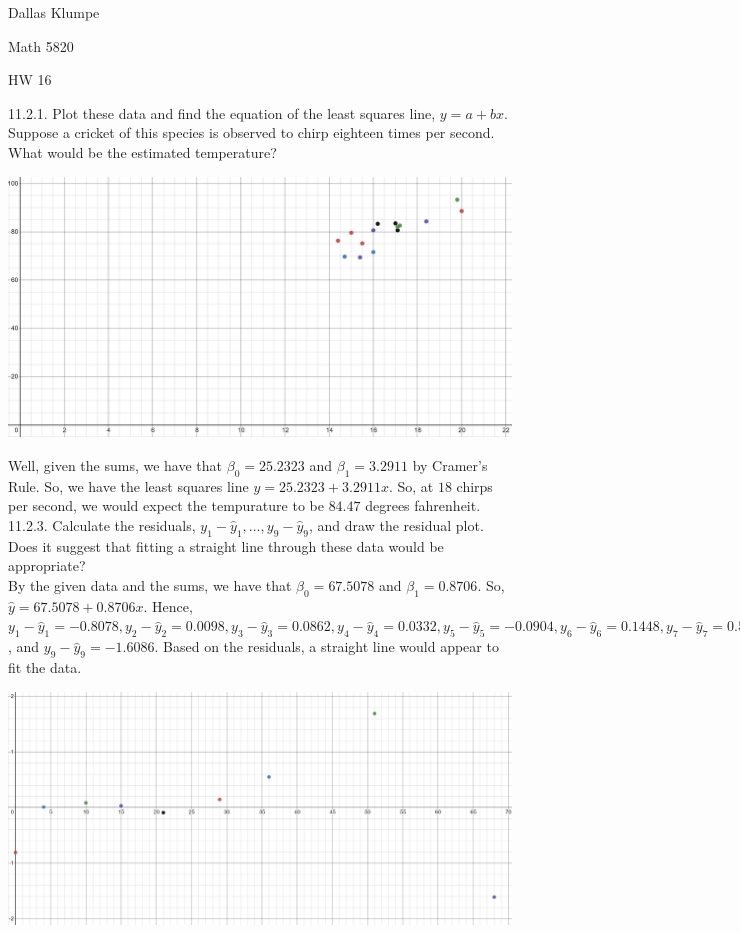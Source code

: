 \documentclass[12pt]{article}
\begin{document}
\noindent Dallas Klumpe

\noindent Math 5820

\noindent HW 16

11.2.1. Plot these data and find the equation of the least squares line, $y=a+bx$. Suppose a cricket of this species is observed to chirp eighteen times per second. What would be the estimated temperature?\\
\begin{center}
\includegraphics[scale=0.5]{11-2-1.JPG}
\end{center}
Well, given the sums, we have that $\beta_0=25.2323$ and $\beta_1=3.2911$ by Cramer's Rule. So, we have the least squares line $y=25.2323+3.2911x$. So, at $18$ chirps per second, we would expect the tempurature to be $84.47$ degrees fahrenheit.\\[20pt]

11.2.3. Calculate the residuals, $y_1-\hat{y}_1,\ldots, y_9-\hat{y}_9$, and draw the residual plot. Does it suggest that fitting a straight line through these data would be appropriate?\\
By the given data and the sums, we have that $\beta_0=67.5078$ and $\beta_1=0.8706$. So, $\hat{y}=67.5078+0.8706x$. Hence, $y_1-\hat{y}_1=-0.8078, y_2-\hat{y}_2=0.0098, y_3-\hat{y}_3=0.0862, y_4-\hat{y}_4=0.0332, y_5-\hat{y}_5=-0.0904, y_6-\hat{y}_6=0.1448, y_7-\hat{y}_7=0.5506, y_8-\hat{y}_8=1.6916$, and $y_9-\hat{y}_9=-1.6086$. Based on the residuals, a straight line would appear to fit the data.
\begin{center}
\includegraphics[scale=0.5]{11-2-3.JPG}
\end{center}
\end{document}
